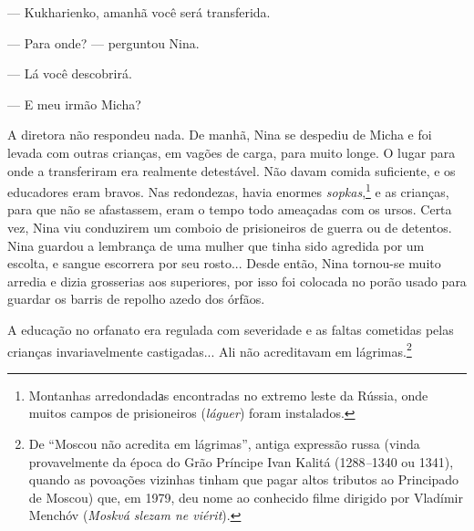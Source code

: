 --- Kukharienko, amanhã você será transferida.

--- Para onde? --- perguntou Nina.

--- Lá você descobrirá.

--- E meu irmão Micha?

A diretora não respondeu nada. De manhã, Nina se despediu de Micha e foi
levada com outras crianças, em vagões de carga, para muito longe. O
lugar para onde a transferiram era realmente detestável. Não davam
comida suficiente, e os educadores eram bravos. Nas redondezas, havia
enormes \emph{sopkas},\footnote{Montanhas arredondadаs encontradas no
  extremo leste da Rússia, onde muitos campos de prisioneiros
  (\emph{láguer}) foram instalados.} e as crianças, para que não se
afastassem, eram o tempo todo ameaçadas com os ursos. Certa vez, Nina
viu conduzirem um comboio de prisioneiros de guerra ou de detentos. Nina
guardou a lembrança de uma mulher que tinha sido agredida por um
escolta, e sangue escorrera por seu rosto... Desde então, Nina tornou-se
muito arredia e dizia grosserias aos superiores, por isso foi colocada
no porão usado para guardar os barris de repolho azedo dos órfãos.

A educação no orfanato era regulada com severidade e as faltas cometidas
pelas crianças invariavelmente castigadas... Ali não acreditavam em
lágrimas.\footnote{De ``Moscou não acredita em lágrimas'', antiga
  expressão russa (vinda provavelmente da época do Grão Príncipe Ivan
  Kalitá (1288\emph{--}1340 ou 1341), quando as povoações vizinhas
  tinham que pagar altos tributos ao Principado de Moscou) que, em 1979,
  deu nome ao conhecido filme dirigido por Vladímir Menchóv
  (\emph{Moskvá slezam ne viérit}).}

